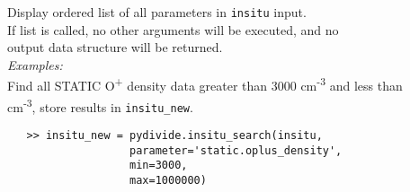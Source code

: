 \documentclass{article}
\begin{document}
\indent \indent Display ordered list of all parameters in \texttt{insitu} input.\\
\indent \indent If list is called, no other arguments will be executed, and no\\
\indent \indent output data structure will be returned.\\
\noindent \textit{Examples:}\\
\indent Find all STATIC O\textsuperscript{+} density data greater than 3000 cm\textsuperscript{-3} and less than\\
 cm\textsuperscript{-3}, store results in \texttt{insitu\_new}.
\vspace{-5mm}
\begin{verbatim}
   >> insitu_new = pydivide.insitu_search(insitu,
                   parameter='static.oplus_density',
                   min=3000,
                   max=1000000)
\end{verbatim}
\end{document}
